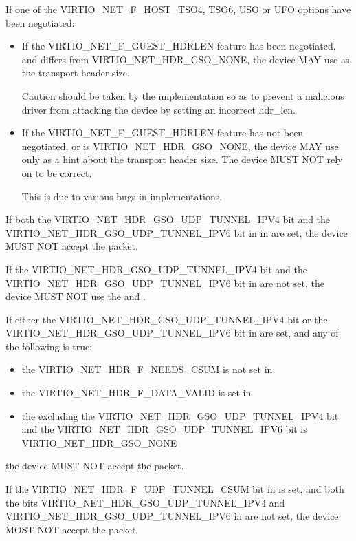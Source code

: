 If one of the VIRTIO_NET_F_HOST_TSO4, TSO6, USO or UFO options have
been negotiated:
\begin{itemize}
\item If the VIRTIO_NET_F_GUEST_HDRLEN feature has been negotiated,
	and  differs from VIRTIO_NET_HDR_GSO_NONE,
	the device MAY use  as the transport header size.

	\begin{note}
	Caution should be taken by the implementation so as to prevent
	a malicious driver from attacking the device by setting an incorrect hdr_len.
	\end{note}

\item If the VIRTIO_NET_F_GUEST_HDRLEN feature has not been negotiated,
	or  is VIRTIO_NET_HDR_GSO_NONE,
	the device MAY use  only as a hint about the
	transport header size.
	The device MUST NOT rely on  to be correct.

	\begin{note}
	This is due to various bugs in implementations.
	\end{note}
\end{itemize}

If both the VIRTIO_NET_HDR_GSO_UDP_TUNNEL_IPV4 bit and
the VIRTIO_NET_HDR_GSO_UDP_TUNNEL_IPV6 bit in in  are set,
the device MUST NOT accept the packet.

If the VIRTIO_NET_HDR_GSO_UDP_TUNNEL_IPV4 bit and the VIRTIO_NET_HDR_GSO_UDP_TUNNEL_IPV6
bit in  are not set, the device MUST NOT use the
 and .

If either the VIRTIO_NET_HDR_GSO_UDP_TUNNEL_IPV4 bit or
the VIRTIO_NET_HDR_GSO_UDP_TUNNEL_IPV6 bit in  are set, and any of
the following is true:
\begin{itemize}
\item the VIRTIO_NET_HDR_F_NEEDS_CSUM is not set in 
\item the VIRTIO_NET_HDR_F_DATA_VALID is set in 
\item the  excluding the VIRTIO_NET_HDR_GSO_UDP_TUNNEL_IPV4
bit and the VIRTIO_NET_HDR_GSO_UDP_TUNNEL_IPV6 bit is VIRTIO_NET_HDR_GSO_NONE
\end{itemize}
the device MUST NOT accept the packet.

If the VIRTIO_NET_HDR_F_UDP_TUNNEL_CSUM bit in  is set,
and both the bits VIRTIO_NET_HDR_GSO_UDP_TUNNEL_IPV4 and
VIRTIO_NET_HDR_GSO_UDP_TUNNEL_IPV6 in  are not set,
the device MOST NOT accept the packet.

